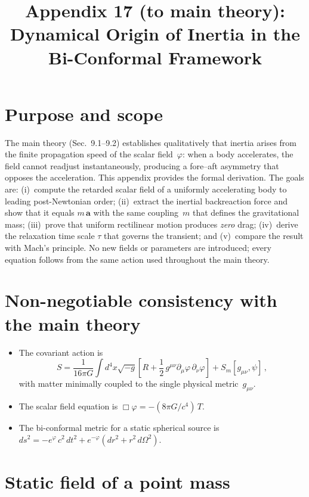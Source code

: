 \documentclass[11pt]{article}
\title{Appendix 17 (to main theory): Dynamical Origin of Inertia
  in the Bi-Conformal Framework}
\author{}
\date{}
\begin{document}
\let\phi\varphi
\maketitle

\section*{Purpose and scope}
The main theory (Sec.~9.1--9.2) establishes qualitatively
that inertia arises from the finite propagation speed of
the scalar field~$\phi$: when a body accelerates, the field
cannot readjust instantaneously, producing a fore--aft
asymmetry that opposes the acceleration.  This appendix
provides the formal derivation.  The goals are:
(i)~compute the retarded scalar field of a uniformly
accelerating body to leading post-Newtonian order;
(ii)~extract the inertial backreaction force and show that
it equals $m\,\mathbf{a}$ with the same coupling~$m$ that
defines the gravitational mass;
(iii)~prove that uniform rectilinear motion produces
\emph{zero} drag;
(iv)~derive the relaxation time scale $\tau$ that governs
the transient; and
(v)~compare the result with Mach's principle.
No new fields or parameters are introduced; every equation
follows from the same action used throughout the main theory.

\section*{Non-negotiable consistency with the main theory}
\begin{itemize}
\item The covariant action is
\begin{equation}\label{eq:action_app17}
S=\frac{1}{16\pi G}\int d^4x\sqrt{-g}\left[R+\frac12\,
  g^{\mu\nu}\partial_\mu\phi\,\partial_\nu\phi\right]
  +S_m[g_{\mu\nu},\psi]\,,
\end{equation}
with matter minimally coupled to the single physical
metric~$g_{\mu\nu}$.
\item The scalar field equation is
$\Box\phi = -(8\pi G/c^4)\,T$.
\item The bi-conformal metric for a static spherical
source is
$ds^2 = -e^{\phi}\,c^2\,dt^2 + e^{-\phi}(dr^2+r^2\,d\Omega^2)$.
\end{itemize}

\section{Static field of a point mass}\label{sec:static_app17}
\end{document}
